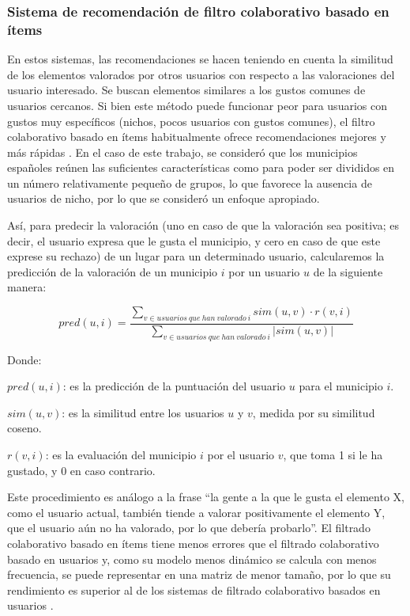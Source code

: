 \subsubsection{Sistema de recomendación de filtro colaborativo basado en ítems}

En estos sistemas, las recomendaciones se hacen teniendo en cuenta la similitud de los elementos valorados por otros usuarios con respecto a las valoraciones del usuario interesado. Se buscan elementos similares a los gustos comunes de usuarios cercanos. Si bien este método puede funcionar peor para usuarios con gustos muy específicos (nichos, pocos usuarios con gustos comunes), el filtro colaborativo basado en ítems habitualmente ofrece recomendaciones mejores y más rápidas \cite{filtro_colaborativo_2}. En el caso de este trabajo, se consideró que los municipios españoles reúnen las suficientes características como para poder ser divididos en un número relativamente pequeño de grupos, lo que favorece la ausencia de usuarios de nicho, por lo que se consideró un enfoque apropiado.

Así, para predecir la valoración (uno en caso de que la valoración sea positiva; es decir, el usuario expresa que le gusta el municipio, y cero en caso de que este exprese su rechazo) de un lugar para un determinado usuario, calcularemos la predicción de la valoración de un municipio $i$ por un usuario $u$ de la siguiente manera:

$$pred(u, i) = \frac{\sum_{v \in usuarios \ que \ han \ valorado \ i} sim(u, v) \cdot r(v, i)}{\sum_{v \in usuarios \ que \ han \ valorado \ i} |sim(u, v)|}$$

Donde:

$pred(u, i)$: es la predicción de la puntuación del usuario $u$ para el municipio $i$.

$sim(u, v)$: es la similitud entre los usuarios $u$ y $v$, medida por su similitud coseno.

$r(v, i)$: es la evaluación del municipio $i$ por el usuario $v$, que toma 1 si le ha gustado, y 0 en caso contrario.

Este procedimiento es análogo a la frase ``la gente a la que le gusta el elemento X, como el usuario actual, también tiende a valorar positivamente el elemento Y, que el usuario aún no ha valorado, por lo que debería probarlo''. El filtrado colaborativo basado en ítems tiene menos errores que el filtrado colaborativo basado en usuarios y, como su modelo menos dinámico se calcula con menos frecuencia, se puede representar en una matriz de menor tamaño, por lo que su rendimiento es superior al de los sistemas de filtrado colaborativo basados en usuarios \cite{filtro_colaborativo_3}.

